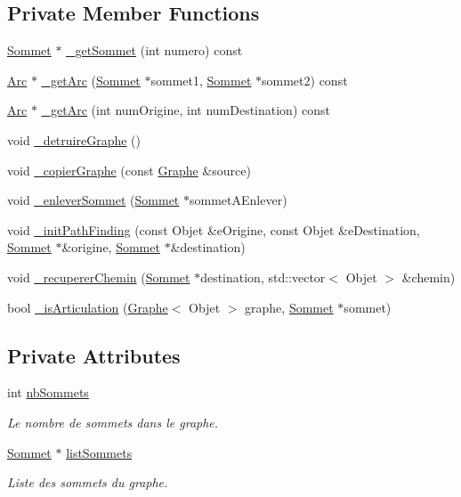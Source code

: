 \subsection*{Private Member Functions}
\begin{DoxyCompactItemize}
\item 
\hyperlink{class_graphe_1_1_sommet}{Sommet} $\ast$ \hyperlink{class_graphe_ac798e3b65595635aaf3e2f83e9a4c58e}{\_\-getSommet} (int numero) const 
\item 
\hyperlink{class_graphe_1_1_arc}{Arc} $\ast$ \hyperlink{class_graphe_a5d918be3eb2738ce483dd804d0b8187d}{\_\-getArc} (\hyperlink{class_graphe_1_1_sommet}{Sommet} $\ast$sommet1, \hyperlink{class_graphe_1_1_sommet}{Sommet} $\ast$sommet2) const 
\item 
\hyperlink{class_graphe_1_1_arc}{Arc} $\ast$ \hyperlink{class_graphe_a3874c74eb79d536e7974fc5ae218ce1c}{\_\-getArc} (int numOrigine, int numDestination) const 
\item 
void \hyperlink{class_graphe_a8405369dbe4854dd624e140539717fab}{\_\-detruireGraphe} ()
\item 
void \hyperlink{class_graphe_a1b8cfc5964a91ed326b4db134471d6e0}{\_\-copierGraphe} (const \hyperlink{class_graphe}{Graphe} \&source)
\item 
void \hyperlink{class_graphe_a2c22cb6d5282d83c940872ec52327d5e}{\_\-enleverSommet} (\hyperlink{class_graphe_1_1_sommet}{Sommet} $\ast$sommetAEnlever)
\item 
void \hyperlink{class_graphe_aae4a7becaa21116b48dbe8d0fbd4a57d}{\_\-initPathFinding} (const Objet \&eOrigine, const Objet \&eDestination, \hyperlink{class_graphe_1_1_sommet}{Sommet} $\ast$\&origine, \hyperlink{class_graphe_1_1_sommet}{Sommet} $\ast$\&destination)
\item 
void \hyperlink{class_graphe_ad45ebb3761173879209aca61ed7d825b}{\_\-recupererChemin} (\hyperlink{class_graphe_1_1_sommet}{Sommet} $\ast$destination, std::vector$<$ Objet $>$ \&chemin)
\item 
bool \hyperlink{class_graphe_ac62e72dd9006cc38115edf51d7c69df2}{\_\-isArticulation} (\hyperlink{class_graphe}{Graphe}$<$ Objet $>$ graphe, \hyperlink{class_graphe_1_1_sommet}{Sommet} $\ast$sommet)
\end{DoxyCompactItemize}
\subsection*{Private Attributes}
\begin{DoxyCompactItemize}
\item 
int \hyperlink{class_graphe_a68b553a71b69dba498e36aa2f22525af}{nbSommets}
\begin{DoxyCompactList}\small\item\em Le nombre de sommets dans le graphe. \end{DoxyCompactList}\item 
\hyperlink{class_graphe_1_1_sommet}{Sommet} $\ast$ \hyperlink{class_graphe_acf9528aa62599ce05830f02df42af339}{listSommets}
\begin{DoxyCompactList}\small\item\em Liste des sommets du graphe. \end{DoxyCompactList}\end{DoxyCompactItemize}
